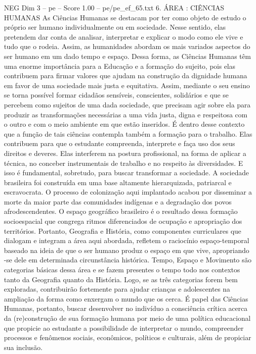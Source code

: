 \begin{textsample}{NEG Dim 3 – pe – Score 1.00 – pe/pe\_ef\_65.txt}  \label{ex:f3_neg_011}
6.
ÁREA : CIÊNCIAS HUMANAS As Ciências Humanas se destacam por ter como objeto de estudo o próprio ser humano individualmente ou em sociedade.
Nesse sentido, elas pretendem dar conta de analisar, interpretar e explicar o modo como ele vive e tudo que o rodeia.
Assim, as humanidades abordam os mais variados aspectos do ser humano em um dado tempo e espaço.
Dessa forma, as Ciências Humanas têm uma enorme importância para a Educação e a formação do sujeito, pois elas contribuem para firmar valores que ajudam na construção da dignidade humana em favor de uma sociedade mais justa e equitativa.
Assim, mediante o seu ensino se torna possível formar cidadãos sensíveis, conscientes, solidários e que se percebem como sujeitos de uma dada sociedade, que precisam agir sobre ela para produzir as transformações necessárias a uma vida justa, digna e respeitosa com o outro e com o meio ambiente em que estão inseridos.
É dentro desse contexto que a função de tais ciências contempla também a formação para o trabalho.
Elas contribuem para que o estudante compreenda, interprete e faça uso dos seus direitos e deveres.
Elas interferem na postura profissional, na forma de aplicar a técnica, no conceber instrumentais de trabalho e no respeito às diversidades.
E isso é fundamental, sobretudo, para buscar transformar a sociedade.
A sociedade brasileira foi construída em uma base altamente hierarquizada, patriarcal e escravocrata.
O processo de colonização aqui implantado acabou por disseminar a morte da maior parte das comunidades indígenas e a degradação dos povos afrodescendentes.
O espaço geográfico brasileiro é o resultado dessa formação socioespacial que congrega ritmos diferenciados de ocupação e apropriação dos territórios.
Portanto, Geografia e História, como componentes curriculares que dialogam e integram a área aqui abordada, refletem o raciocínio espaço-temporal baseado na ideia de que o ser humano produz o espaço em que vive, apropriando -se dele em determinada circunstância histórica.
Tempo, Espaço e Movimento são categorias básicas dessa área e se fazem presentes o tempo todo nos contextos tanto da Geografia quanto da História.
Logo, se as três categorias forem bem exploradas, contribuirão fortemente para ajudar crianças e adolescentes na ampliação da forma como enxergam o mundo que os cerca.
É papel das Ciências Humanas, portanto, buscar desenvolver no indivíduo a consciência crítica acerca da (re)construção de sua formação humana por meio de uma política educacional que propicie ao estudante a possibilidade de interpretar o mundo, compreender processos e fenômenos sociais, econômicos, políticos e culturais, além de propiciar sua inclusão.

\end{textsample}

